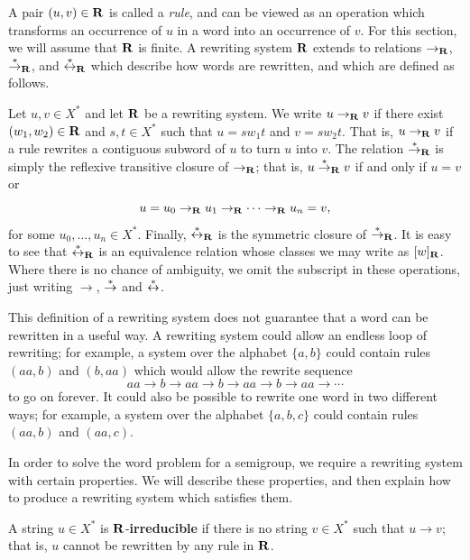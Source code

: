 A pair $(u,v) \in \mathbf{R}$ is called a \textit{rule},  and can be viewed as
an operation which transforms an occurrence of $u$ in a word into an occurrence
of $v$.
For this section, we will assume that $\mathbf{R}$ is finite.
A rewriting system $\mathbf{R}$ extends to relations
$\to_{\mathbf{R}}$, $\stackrel{*}{\to}_{\mathbf{R}}$, and $\stackrel{*}{\leftrightarrow}_{\mathbf{R}}$
which describe how words are rewritten, and which are defined as follows.

Let $u, v \in X^*$ and let $\mathbf{R}$ be a rewriting system.
We write $u \to_{\mathbf{R}} v$ if there exist $(w_1, w_2) \in \mathbf{R}$ and
$s, t \in X^*$ such that $u=sw_1t$ and $v=sw_2t$.
That is, $u \to_{\mathbf{R}} v$ if a rule rewrites a contiguous subword of $u$ to turn
$u$ into $v$.  The relation $\stackrel{*}{\to}_{\mathbf{R}}$ is simply the reflexive transitive
closure of $\to_{\mathbf{R}}$; that is, $u \stackrel{*}{\to}_{\mathbf{R}} v$ if and only if $u = v$ or
$$u = u_0 \to_{\mathbf{R}} u_1 \to_{\mathbf{R}} \cdots \to_{\mathbf{R}} u_n = v,$$
for some $u_0, \ldots, u_n \in X^*$.
Finally, $\stackrel{*}{\leftrightarrow}_{\mathbf{R}}$ is the symmetric closure of
$\stackrel{*}{\to}_{\mathbf{R}}$.  It is easy to see that $\stackrel{*}{\leftrightarrow}_{\mathbf{R}}$ is an equivalence
relation whose classes we may write as $[w]_{\mathbf{R}}$.
Where there is no chance of ambiguity, we omit the subscript in these
operations, just writing $\to$, $\stackrel{*}{\to}$ and $\stackrel{*}{\leftrightarrow}$.

This definition of a rewriting system does not guarantee that a word can be
rewritten in a useful way.  A rewriting system could allow an endless loop of
rewriting; for example, a system over the alphabet $\{a,b\}$ could contain rules
$(aa,b)$ and $(b,aa)$ which would allow the rewrite sequence
$$aa \to b \to aa \to b \to aa \to b \to aa \to \cdots$$
to go on forever.  It could also be possible to rewrite one word in
two different ways; for example, a system over the alphabet $\{a,b,c\}$ could
contain rules $(aa,b)$ and $(aa,c)$.

In order to solve the word problem for a semigroup, we require a
rewriting system with certain properties.  We will describe these properties,
and then explain how to produce a rewriting system which satisfies them.

\begin{definition}
  \label{def:irreducible}
  A string $u \in X^*$ is $\mathbf{R}$-\textbf{irreducible} if there is no
  string $v \in X^*$ such that $u \to v$; that is, $u$ cannot be rewritten by
  any rule in $\mathbf{R}$.  \cite[Def~12.13]{cgt}
\end{definition}


